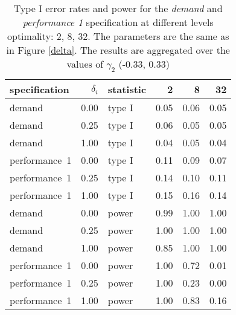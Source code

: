 \begin{table}[ht]
\centering
\begingroup\footnotesize
\begin{tabular}{lrlrrr}
  \hline
specification & $\delta_i$ & statistic & 2 & 8 & 32 \\ 
  \hline
demand & 0.00 & type I & 0.05 & 0.06 & 0.05 \\ 
  demand & 0.25 & type I & 0.06 & 0.05 & 0.05 \\ 
  demand & 1.00 & type I & 0.04 & 0.05 & 0.04 \\ 
  performance~1 & 0.00 & type I & 0.11 & 0.09 & 0.07 \\ 
  performance~1 & 0.25 & type I & 0.14 & 0.10 & 0.11 \\ 
  performance~1 & 1.00 & type I & 0.15 & 0.16 & 0.14 \\ 
  demand & 0.00 & power & 0.99 & 1.00 & 1.00 \\ 
  demand & 0.25 & power & 1.00 & 1.00 & 1.00 \\ 
  demand & 1.00 & power & 0.85 & 1.00 & 1.00 \\ 
  performance~1 & 0.00 & power & 1.00 & 0.72 & 0.01 \\ 
  performance~1 & 0.25 & power & 1.00 & 0.23 & 0.00 \\ 
  performance~1 & 1.00 & power & 1.00 & 0.83 & 0.16 \\ 
   \hline
\end{tabular}
\endgroup
\caption{Type I error rates and power for the \emph{demand}
             and \emph{performance 1} specification at different levels 
             optimality: 2, 8, 32. The parameters are the same as in 
             Figure \ref{delta}. The results are aggregated over the values              of $\gamma_2$ (-0.33, 0.33)} 
\label{delta-table}
\end{table}
